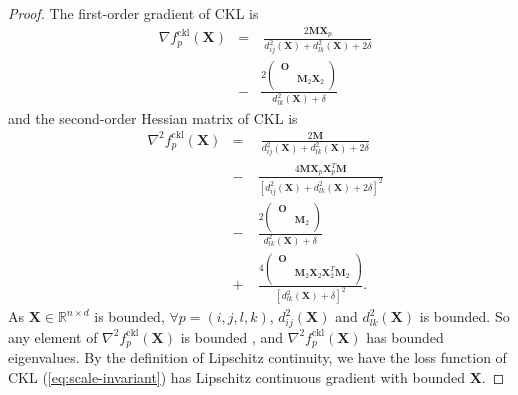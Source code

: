 \documentclass[./sbb_ordinal_embedding_aaai18.tex]{subfiles}%
\begin{document}
\begin{proof}
		The first-order gradient of CKL is
		\begin{equation}
		\begin{aligned}
		& \nabla f^{\text{ckl}}_p(\mathbf{X}) &=&\
		\frac{2\mathbf{MX}_p}{d^2_{ij}(\mathbf{X})+d^2_{lk}(\mathbf{X})+2\delta}\\
		& &-& \frac{2\left(\begin{array}{cc}\ \mathbf{O} & \\ & \mathbf{M}_2\mathbf{X}_2 \\ \end{array}\right)}{d^2_{lk}(\mathbf{X})+\delta}
		\end{aligned}
		\end{equation}
		and the second-order Hessian matrix of CKL is
		\begin{equation}
		\begin{aligned}
		& \nabla^2 f^{\text{ckl}}_p(\mathbf{X}) &=&\ \ \frac{2\mathbf{M}}{d^2_{ij}(\mathbf{X})+d^2_{lk}(\mathbf{X})+2\delta}\\
		& &-&\ \frac{4\mathbf{MX}_p\mathbf{X}_p^T\mathbf{M}}{[d^2_{ij}(\mathbf{X})+d^2_{lk}(\mathbf{X})+2\delta]^2} \\
		& &-&\ \frac{2\left(\begin{array}{cc}\ \mathbf{O} & \\ & \mathbf{M}_2 \\ \end{array}\right)}{d^2_{lk}(\mathbf{X})+\delta}\\
		& &+&\ \frac{4\left(\begin{array}{cc}\ \mathbf{O} & \\ & \mathbf{M}_2\mathbf{X}_2\mathbf{X}^T_2\mathbf{M}_2 \\ \end{array}\right)}{[d^2_{lk}(\mathbf{X})+\delta]^2}.
		\end{aligned}
		\end{equation}
		As $\mathbf{X}\in\mathbb{R}^{n\times d}$ is bounded, $\forall p=(i,j,l,k)$, $d^2_{ij}(\mathbf{X})$ and $d^2_{lk}(\mathbf{X})$ is bounded. So any element of $\nabla^2 f^{\text{ckl}}_p(\mathbf{X})$ is bounded , and $\nabla^2 f^{\text{ckl}}_p(\mathbf{X})$ has bounded eigenvalues. By the definition of Lipschitz continuity, we have the loss function of CKL (\ref{eq:scale-invariant}) has Lipschitz continuous gradient with bounded $\mathbf{X}$.
		

\end{proof}
\end{document}
